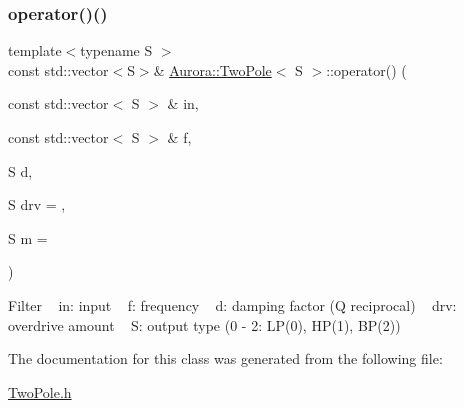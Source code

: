 \subsubsection{\texorpdfstring{operator()()}{operator()()}\hspace{0.1cm}{\footnotesize\ttfamily [2/2]}}
{\footnotesize\ttfamily template$<$typename S $>$ \\
const std\+::vector$<$S$>$\& \hyperlink{class_aurora_1_1_two_pole}{Aurora\+::\+Two\+Pole}$<$ S $>$\+::operator() (\begin{DoxyParamCaption}\item[{const std\+::vector$<$ S $>$ \&}]{in,  }\item[{const std\+::vector$<$ S $>$ \&}]{f,  }\item[{S}]{d,  }\item[{S}]{drv = {},  }\item[{S}]{m = {} }\end{DoxyParamCaption})\hspace{0.3cm}{\ttfamily [inline]}}

Filter ~\newline
in\+: input ~\newline
f\+: frequency ~\newline
d\+: damping factor (Q reciprocal) ~\newline
drv\+: overdrive amount ~\newline
S\+: output type (0 -\/ 2\+: L\+P(0), H\+P(1), B\+P(2)) 

The documentation for this class was generated from the following file\+:\begin{DoxyCompactItemize}
\item 
\hyperlink{_two_pole_8h}{Two\+Pole.\+h}\end{DoxyCompactItemize}
